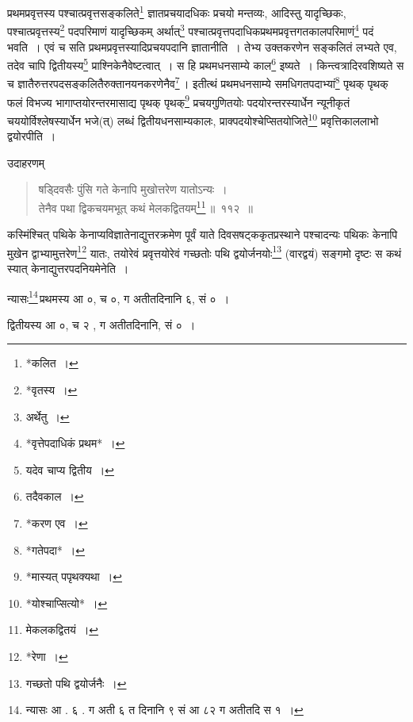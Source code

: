 \documentclass[10pt, openany]{book}
\begin{document}
{{{{{{{{{{{{{{{प्रथमप्रवृत्तस्य पश्चात्प्रवृत्तसङ्कलिते\renewcommand{\thefootnote}{११}\footnote{*कलित~।}  ज्ञातप्रचयादधिकः प्रचयो
मन्तव्यः, आदिस्तु}
{यादृच्छिकः, पश्चात्प्रवृत्तस्य\renewcommand{\thefootnote}{१२}\footnote{*वृतस्य~।} पदपरिमाणं यादृच्छिकम्
अर्थात्\renewcommand{\thefootnote}{१३}\footnote{अर्थेतु~।} पश्चात्प्रवृत्तपदाधिकप्रथमप्रवृत्तगतकालपरिमाणं\renewcommand{\thefootnote}{१४}\footnote{*वृत्तेपदाधिकं प्रथम*~।} पदं भवति~। एवं च सति
प्रथमप्रवृत्तस्यादिप्रचयपदानि ज्ञातानीति~।}
{तेभ्य उक्तकरणेन सङ्कलितं लभ्यते एव, तदेव चापि द्वितीयस्य\renewcommand{\thefootnote}{१५}\footnote{यदेव चाप्य द्वितीय~।}
प्राश्निकेनैवेष्टत्वात्~।}
{स हि प्रथमधनसाम्ये काल\renewcommand{\thefootnote}{१६}\footnote{तदैवकाल~।} इष्यते~। किन्त्वत्रादिरवशिष्यते स च
ज्ञातैरुत्तरपदसङ्कलितैरुक्तानयनकरणेनैव\renewcommand{\thefootnote}{१७}\footnote{*करण एव~।}\,। इतीत्थं प्रथमधनसाम्ये समधिगतपदाभ्यां\renewcommand{\thefootnote}{१८}\footnote{*गतेपदा*~।}
पृथक् पृथक् फलं विभज्य}
{भागाप्तयोरन्तरमासाद्य पृथक् पृथक्\renewcommand{\thefootnote}{१९}\footnote{*मास्यत् पपृथक्यथा~।} प्रचयगुणितयोः
पदयोरन्तरस्यार्धेन न्यूनीकृतं}
{चययोर्विश्लेषस्यार्धेन भजे(त्) लब्धं द्वितीयधनसाम्यकालः,
प्राक्पदयोश्चेप्सितयोजिते\renewcommand{\thefootnote}{२०}\footnote{*योश्चाप्सित्यो*~।}}
{प्रवृत्तिकाललाभो द्वयोरपीति~।}
\vspace{3mm}

{उदाहरणम्\textendash}

\begin{quote}
    
{\eg षड्दिवसैः पुंसि गते केनापि मुखोत्तरेण यातोऽन्यः~।\\
 तेनैव पथा द्विकचयमभूत् कथं मेलकद्वितयम्\renewcommand{\thefootnote}{२१}\footnote{मेकलकद्वितयं~।}\,॥~११२~॥} \end{quote}

\newpage

{कस्मिंश्चित् पथिके केनाप्यविज्ञातेनाद्युत्तरक्रमेण पूर्वं याते
दिवसषट्ककृतप्रस्थाने}
{पश्चादन्यः पथिकः केनापि मुखेन द्वाभ्यामुत्तरेण\renewcommand{\thefootnote}{१}\footnote{*रेणा~।}  यातः, तयोरेवं
प्रवृत्तयोरेवं गच्छतोः पथि}
{द्वयोर्जनयोः\renewcommand{\thefootnote}{२}\footnote{गच्छतो पथि द्वयोर्जनैः~।} (वारद्वयं) सङ्गमो दृष्टः स कथं स्यात्
केनाद्युत्तरपदनियमेनेति~।}
\vspace{3mm}

{न्यासः\renewcommand{\thefootnote}{३}\footnote{न्यासः आ . ६ . ग अती ६
त दिनानि ९ सं आ ८२ ग अतीतदि स १~।}\textendash \,प्रथमस्य आ ०, च ०, ग अतीतदिनानि ६, सं ०~।}

\hspace{10mm} {द्वितीयस्य आ ०, च २ , ग अतीतदिनानि, सं ०~।}
\vspace{3mm}

}}}}}}}}}}}}}}
\end{document}
